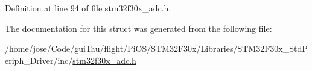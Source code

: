 Definition at line 94 of file stm32f30x\-\_\-adc.\-h.



The documentation for this struct was generated from the following file\-:\begin{DoxyCompactItemize}
\item 
/home/jose/\-Code/gui\-Tau/flight/\-Pi\-O\-S/\-S\-T\-M32\-F30x/\-Libraries/\-S\-T\-M32\-F30x\-\_\-\-Std\-Periph\-\_\-\-Driver/inc/\hyperlink{stm32f30x__adc_8h}{stm32f30x\-\_\-adc.\-h}\end{DoxyCompactItemize}
